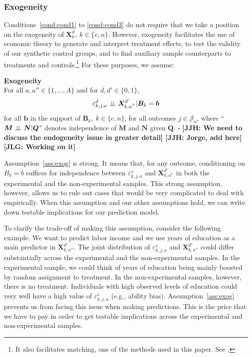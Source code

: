\subsubsection{Exogeneity}

Conditions~\ref{cond:cond1} to \ref{cond:cond3} do not require that we take a position on the exogeneity of $\bm{X}^d_k, \: k \in \{e,n\}$. However, exogeneity facilitates the use of economic theory to generate and interpret treatment effects, to test the validity of our synthetic control groups, and to find auxiliary sample counterparts to treatments and controls.\footnote{It also facilitates matching, one of the methods used in this paper. See \cite{Heckman_Navarro_2004_REStat}.} For these purposes, we assume:

\onehalfspacing
\begin{assumption}\label{ass:exog} \textbf{Exogeneity}\\
For all $a, a'' \in \{ 1, \ldots, A \}$ and for $d, d' \in \{0,1\}$,
\begin{equation}
\varepsilon^d_{k,j,a} \perp\!\!\!\perp \bm{X}^{d^{\prime}}_{k,a^{''}} | \bm{B}_k = \bm{b}
\end{equation}
for all $\bm{b}$ in the support of $\bm{B}_k, \: k \in \{e,n\}$, for all outcomes $j \in \mathcal{J}_{a}$, where ``$\bm{M} \perp\!\!\!\perp \bm{N}|\bm{Q}$'' denotes independence of $\bm{M}$ and $\bm{N}$ given $\bm{Q}$. $\square$  \textbf{[JJH: We need to discuss the endogeneity issue in greater detail] [JJH: Jorge, add here] [JLG: Working on it]}
\end{assumption}
\doublespacing

Assumption~\ref{ass:exog} is strong. It means that, for any outcome, conditioning on $B_{k} = b$ suffices for independence between $\varepsilon_{k,j,a}^s$ and $\bm{X}_{k,{a''}}^{d'}$ in both the experimental and the non-experimental samples. This strong assumption, however, allows us to rule out cases that would be very complicated to deal with empirically. When this assumption and our other assumptions hold, we can write down testable implications for our prediction model. 

To clarify the trade-off of making this assumption, consider the following example. We want to predict labor income and we use years of education as a main predictor in $\bm{X}_{k,{a''}}^{d'}$. The joint distribution of $\varepsilon_{k,j,a}^s$ and $\bm{X}_{k,{a''}}^{d'}$ could differ substantially across the experimental and the non-experimental samples. In the experimental sample, we could think of years of education being mainly boosted by random assignment to treatment. In the non-experimental samples, however, there is no treatment. Individuals with high observed levels of education could very well have a high value of  $\varepsilon_{k,j,a}^s$ (e.g., ability bias). Assumption~\ref{ass:exog} prevents us from facing this issue when making predictions. This is the price that we have to pay in order to get testable implications across the experimental and non-experimental samples.

